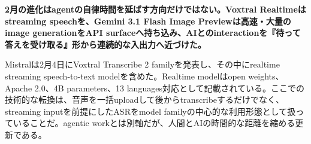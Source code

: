 \noindent\textbf{2月の進化はagentの自律時間を延ばす方向だけではない。Voxtral Realtimeはstreaming speechを、Gemini 3.1 Flash Image Previewは高速・大量のimage generationをAPI surfaceへ持ち込み、AIとのinteractionを『待って答えを受け取る』形から連続的な入出力へ近づけた。}\autocite{src-a24fd97eb3d0,src-d8b7c1c36830}

Mistralは2月4日にVoxtral Transcribe 2 familyを発表し、その中にrealtime streaming speech-to-text modelを含めた。Realtime modelはopen weights、Apache 2.0、4B parameters、13 languages対応として記載されている。ここでの技術的な転換は、音声を一括uploadして後からtranscribeするだけでなく、streaming inputを前提にしたASRをmodel familyの中心的な利用形態として扱っていることだ。agentic workとは別軸だが、人間とAIの時間的な距離を縮める更新である。\autocite{src-d8b7c1c36830}


